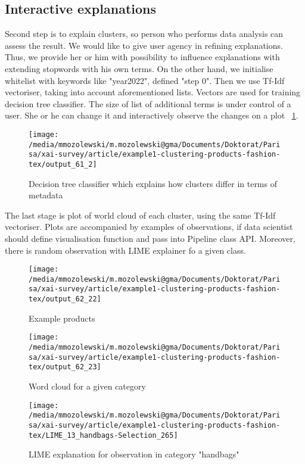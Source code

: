 \documentclass[
 twocolumn,
]{ceurart}
\begin{document}
\subsection{Interactive explanations}
Second step is to explain clusters, so person who performs data analysis can assess the result.
We would like to give user agency in refining explanations.
Thus, we provide her or him with possibility to influence explanations with extending stopwords with his own terms.
On the other hand, we initialise whitelist with keywords like "year2022", defined "step 0".
Then we use Tf-Idf vectoriser, taking into account aforementioned lists.
Vectors are used for training decision tree classifier.
The size of list of additional terms is under control of a user.
She or he can change it and interactively observe the changes on a plot ~\ref{fig:decision_tree}.
\begin{figure}[h!]
  \centering
  \texttt{[image: /media/mmozolewski/m.mozolewski@gma/Documents/Doktorat/Parisa/xai-survey/article/example1-clustering-products-fashion-tex/output\_61\_2]}
  \caption{Decision tree classifier which explains how clusters differ in terms of metadata}
  \label{fig:decision_tree}
\end{figure}
The last stage is plot of world cloud of each cluster, using the same Tf-Idf vectoriser.
Plots are accompanied by examples of observations, if data scientist should define visualisation function and pass into Pipeline class API.
Moreover, there is random observation with LIME explainer fo a given class.
\begin{figure}[h!]
  \centering
  \texttt{[image: /media/mmozolewski/m.mozolewski@gma/Documents/Doktorat/Parisa/xai-survey/article/example1-clustering-products-fashion-tex/output\_62\_22]}
  \caption{Example products}
  \label{fig:example_products}
\end{figure}
\begin{figure}[h!]
  \centering
  \texttt{[image: /media/mmozolewski/m.mozolewski@gma/Documents/Doktorat/Parisa/xai-survey/article/example1-clustering-products-fashion-tex/output\_62\_23]}
  \caption{Word cloud for a given category}
  \label{fig:wordcloud}
\end{figure}
\begin{figure}[h!]
  \centering
  \texttt{[image: /media/mmozolewski/m.mozolewski@gma/Documents/Doktorat/Parisa/xai-survey/article/example1-clustering-products-fashion-tex/LIME\_13\_handbags-Selection\_265]}
  \caption{LIME explanation for observation in category "handbags"}
  \label{fig:lime}
\end{figure}
\end{document}
